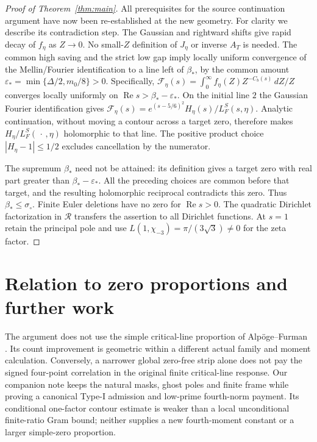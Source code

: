 \documentclass[11pt,a4paper]{article}
\theoremstyle{definition}
\newcommand{\Rea}{\operatorname{Re}}
\newcommand{\eps}{\varepsilon}
\newcommand{\sig}{\sigma_\circ}
\newcommand{\bet}{\beta_*}
\begin{document}
\begin{proof}[Proof of Theorem~\ref{thm:main}]
All prerequisites for the source continuation argument have now
been re-established at the new geometry.
For clarity we describe its contradiction step.
The Gaussian and rightward shifts give rapid decay of $f_\eta$
as $Z\to0$. No small-$Z$ definition of $J_\eta$ or inverse
$A_T$ is needed.
The common high saving and the strict low gap imply locally
uniform convergence of the Mellin/Fourier identification to a
line left of $\bet$, by the common amount
$\eps_*=\min\{\Delta/2,m_0/8\}>0$.
Specifically,
$\mathcal F_\eta(s)=\int_0^\infty
f_\eta(Z)Z^{-C_b(s)}\,dZ/Z$ converges locally uniformly on
$\Rea s>\bet-\eps_*$. On the initial line $2$ the Gaussian
Fourier identification gives
$\mathcal F_\eta(s)=e^{(s-5/6)^2}H_\eta(s)/L_F^S(s,\eta)$.
Analytic continuation, without moving a contour across a target
zero, therefore makes
$H_\eta/L_F^S(\,\cdot\,,\eta)$ holomorphic to that line.
The positive product choice $|H_\eta-1|\le1/2$ excludes
cancellation by the numerator.

The supremum $\bet$ need not be attained: its definition gives
a target zero with real part greater than $\bet-\eps_*$.
All the preceding choices are common before that target, and
the resulting holomorphic reciprocal contradicts this zero.
Thus $\bet\le\sig$.
Finite Euler deletions have no zero for $\Rea s>0$.
The quadratic Dirichlet factorization in $\mathcal R$ transfers
the assertion to all Dirichlet functions.
At $s=1$ retain the principal pole and use
$L(1,\chi_{-3})=\pi/(3\sqrt3)\ne0$ for the zeta factor.
\end{proof}

\section{Relation to zero proportions and further work}
The argument does not use the simple critical-line proportion
of Alp\"oge--Furman \cite{AF}. Its count improvement is geometric
within a different actual family and moment calculation.
Conversely, a narrower global zero-free strip alone does not pay
the signed four-point correlation in the original finite
critical-line response.
Our companion note \cite{Note448} keeps the natural masks,
ghost poles and finite frame while proving a canonical
Type-I admission and low-prime fourth-norm payment.
Its conditional one-factor contour estimate is weaker than a
local unconditional finite-ratio Gram bound; neither supplies a
new fourth-moment constant or a larger simple-zero proportion.
\end{document}
